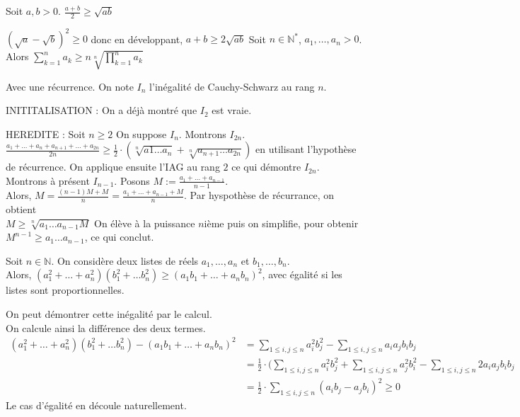 \pro [Inégalité arithmético géométrique, cas $n=2$]

Soit $a, b >0$. $\frac{a+b}{2} \geq \sqrt{ab}$ 

\preuve 

$(\sqrt{a}-\sqrt{b} )^2 \geq 0$ donc en développant, $a+b \geq 2\sqrt{ab}$
Soit $n\in \mathbb{N^*}$, $a_1,\dots, a_n >0$. Alors $\sum_{k=1}^n a_k \geq n\sqrt[n]{\prod_{k=1}^na_k}$

\preuve Avec une récurrence. On note $I_n$ l'inégalité de Cauchy-Schwarz au rang $n$. 

INITITALISATION : On a déjà montré que $I_2$ est vraie. 

HEREDITE : Soit $n\geq 2$ On suppose $I_n$. Montrons $I_{2n}$. \\ $\frac{a_1+ \dots + a_n + a_{n+1} + \dots + a_{2n}}{2n} \geq \frac{1}{2} \cdot (\sqrt[n]{a1\dots a_n} + \sqrt[n]{a_{n+1}\dots a_{2n}})$ en utilisant l'hypothèse de récurrence. 
On applique ensuite l'IAG au rang $2$ ce qui démontre $I_{2n}$. \\ Montrons à présent $I_{n-1}$. Posons $M := \frac{a_1+\dots + a_{n-1}}{n-1}$. \\ Alors, $M = \frac{(n-1)M+M}{n} = \frac{a_1+\dots+a_{n-1} + M}{n}$. Par hyspothèse de récurrance, on obtient \\ $M \geq \sqrt[n]{a_1 \dots a_{n-1} M} $ On élève à la puissance $n$ième puis on simplifie, pour obtenir $M^{n-1} \geq a_1\dots a_{n-1}$, ce qui conclut. 


Soit $n \in \mathbb{N}$. On considère deux listes de réels $a_1, \dots, a_n$ et $b_1, \dots, b_n$. \\ Alors, $(a_1^2+\dots + a_n^2)(b_1^2+ \dots b_n^2) \geq (a_1b_1 + \dots + a_nb_n)^2$, avec égalité si les listes sont proportionnelles. 

\preuve On peut démontrer cette inégalité par le calcul. \\ On calcule ainsi la différence des deux termes. 
\begin{align*}
(a_1^2+\dots + a_n^2)(b_1^2+ \dots b_n^2)-(a_1b_1 + \dots + a_nb_n)^2 &= \sum_{1\leq i, j \leq n} a_i^2b_j^2 - \sum_{1 \leq i, j \leq n} a_ia_jb_ib_j \\
&= \frac{1}{2} \cdot (\sum_{1\leq i, j \leq n} a_i^2b_j^2 + \sum_{1\leq i, j \leq n} a_j^2b_i^2 - \sum_{1 \leq i, j \leq n} 2a_ia_jb_ib_j \\
&= \frac{1}{2} \cdot \sum_{1\leq i, j \leq n} (a_ib_j-a_jb_i)^2 \geq 0 
\end{align*}
Le cas d'égalité en découle naturellement. 

